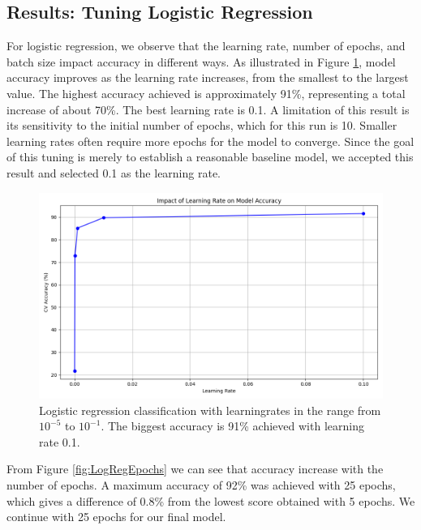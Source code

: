 \subsection{Results: Tuning Logistic Regression }
For logistic regression, we observe that the learning rate, number of epochs, and batch size impact accuracy in different ways. As illustrated in Figure \ref{fig:LogRegLearningRate}, model accuracy improves as the learning rate increases, from the smallest to the largest value. The highest accuracy achieved is approximately 91\%, representing a total increase of about 70\%. The best learning rate is 0.1. A limitation of this result is its sensitivity to the initial number of epochs, which for this run is 10. Smaller learning rates often require more epochs for the model to converge. Since the goal of this tuning is merely to establish a reasonable baseline model, we accepted this result and selected 0.1 as the learning rate.

\begin{figure}[H]
    \centering
    \includegraphics[width=\textwidth]{results/logreg/learning_rate_study.png}
    \caption{Logistic regression classification with learningrates in the range from $10^{-5}$ to $10^{-1}$. The biggest accuracy is 91\% achieved with learning rate 0.1.}
    \label{fig:LogRegLearningRate}
\end{figure}

\newpage
From Figure \ref{fig:LogRegEpochs} we can see that accuracy increase with the number of epochs. A maximum accuracy of 92\% was achieved with 25 epochs, which gives a difference of 0.8\% from the lowest score obtained with 5 epochs. We continue with 25 epochs for our final model.


